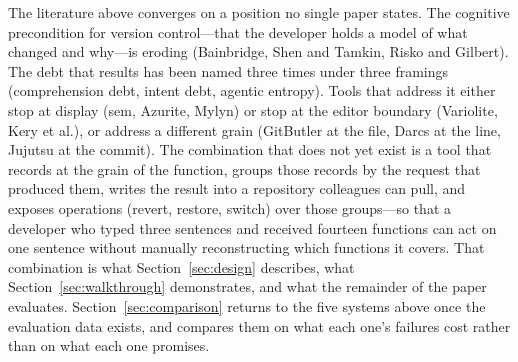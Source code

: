 \medskip\noindent
The literature above converges on a position no single paper states. The
cognitive precondition for version control---that the developer holds a model of
what changed and why---is eroding (Bainbridge, Shen and Tamkin, Risko and Gilbert).
The debt that results has been named three times under three framings (comprehension
debt, intent debt, agentic entropy). Tools that address it either stop at
display (sem, Azurite, Mylyn) or stop at the editor boundary (Variolite, Kery et
al.), or address a different grain (GitButler at the file, Darcs at the line,
Jujutsu at the commit). The combination that does not yet exist is a tool that
records at the grain of the function, groups those records by the request that
produced them, writes the result into a repository colleagues can pull, and exposes
operations (revert, restore, switch) over those groups---so that a developer who
typed three sentences and received fourteen functions can act on one sentence
without manually reconstructing which functions it covers. That combination is what
Section~\ref{sec:design} describes, what Section~\ref{sec:walkthrough}
demonstrates, and what the remainder of the paper evaluates.
Section~\ref{sec:comparison} returns to the five systems above once the evaluation
data exists, and compares them on what each one's failures cost rather than on
what each one promises.
